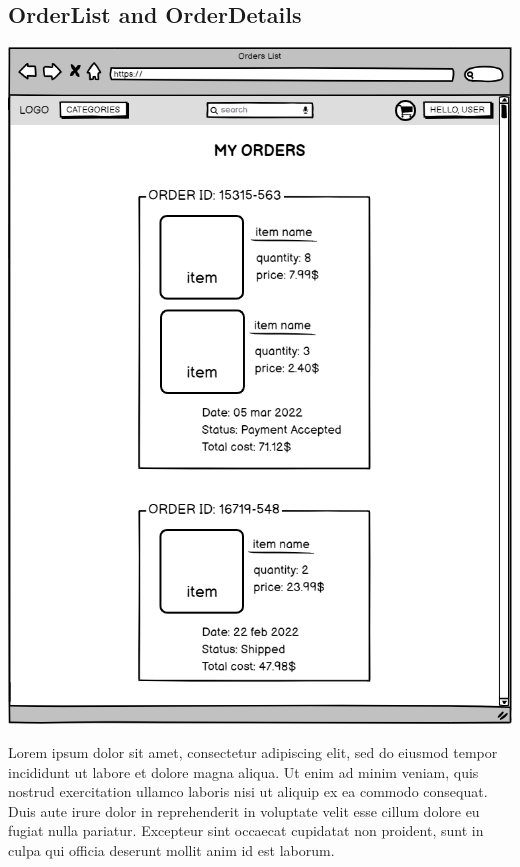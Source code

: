 \subsection{OrderList and OrderDetails}
    \includegraphics[width=\textwidth,height=\textheight,keepaspectratio]{mockups/ordersPageMockup.png}

    Lorem ipsum dolor sit amet, consectetur adipiscing elit, sed do eiusmod tempor incididunt ut labore et dolore magna aliqua. Ut enim ad minim veniam, quis nostrud exercitation ullamco laboris nisi ut aliquip ex ea commodo consequat. Duis aute irure dolor in reprehenderit in voluptate velit esse cillum dolore eu fugiat nulla pariatur. Excepteur sint occaecat cupidatat non proident, sunt in culpa qui officia deserunt mollit anim id est laborum.


